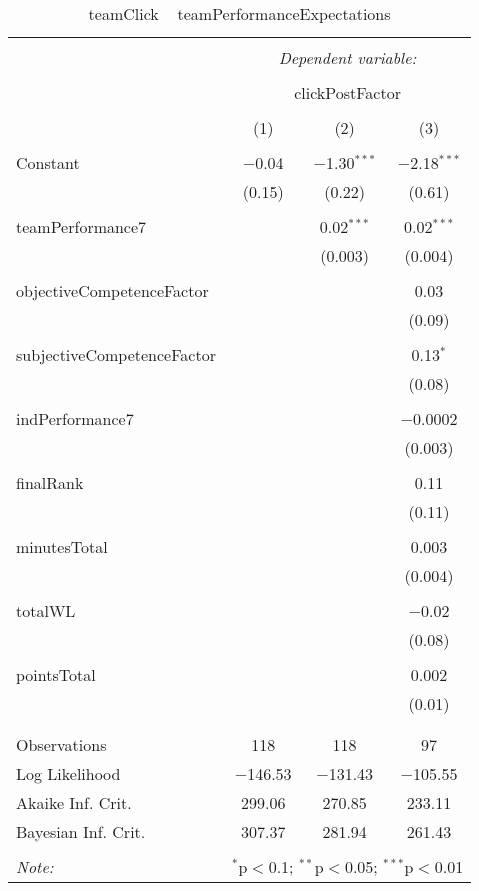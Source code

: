 \documentclass[12pt]{report}
\begin{document}
\begin{table}[!htbp] \centering
  \caption{teamClick ~ teamPerformanceExpectations}
  \label{}
\begin{tabular}{@{\extracolsep{5pt}}lccc}
\\[-1.8ex]\hline
\hline \\[-1.8ex]
 & \multicolumn{3}{c}{\textit{Dependent variable:}} \\
\cline{2-4}
\\[-1.8ex] & \multicolumn{3}{c}{clickPostFactor} \\
\\[-1.8ex] & (1) & (2) & (3)\\
\hline \\[-1.8ex]
 Constant & $-$0.04 & $-$1.30$^{***}$ & $-$2.18$^{***}$ \\
  & (0.15) & (0.22) & (0.61) \\
  & & & \\
 teamPerformance7 &  & 0.02$^{***}$ & 0.02$^{***}$ \\
  &  & (0.003) & (0.004) \\
  & & & \\
 objectiveCompetenceFactor &  &  & 0.03 \\
  &  &  & (0.09) \\
  & & & \\
 subjectiveCompetenceFactor &  &  & 0.13$^{*}$ \\
  &  &  & (0.08) \\
  & & & \\
 indPerformance7 &  &  & $-$0.0002 \\
  &  &  & (0.003) \\
  & & & \\
 finalRank &  &  & 0.11 \\
  &  &  & (0.11) \\
  & & & \\
 minutesTotal &  &  & 0.003 \\
  &  &  & (0.004) \\
  & & & \\
 totalWL &  &  & $-$0.02 \\
  &  &  & (0.08) \\
  & & & \\
 pointsTotal &  &  & 0.002 \\
  &  &  & (0.01) \\
  & & & \\
\hline \\[-1.8ex]
Observations & 118 & 118 & 97 \\
Log Likelihood & $-$146.53 & $-$131.43 & $-$105.55 \\
Akaike Inf. Crit. & 299.06 & 270.85 & 233.11 \\
Bayesian Inf. Crit. & 307.37 & 281.94 & 261.43 \\
\hline
\hline \\[-1.8ex]
\textit{Note:}  & \multicolumn{3}{r}{$^{*}$p$<$0.1; $^{**}$p$<$0.05; $^{***}$p$<$0.01} \\
\end{tabular}
\end{table}
\end{document}
